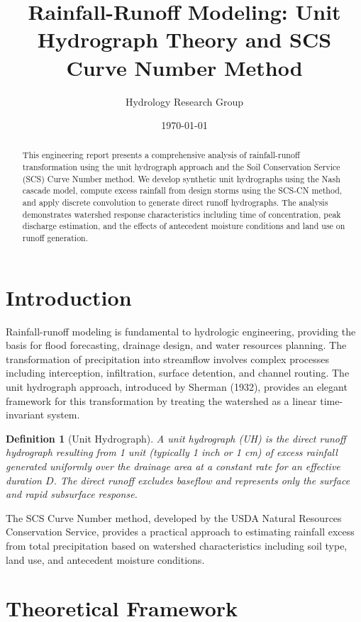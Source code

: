 \documentclass[a4paper, 11pt]{article}
\title{Rainfall-Runoff Modeling: Unit Hydrograph Theory and SCS Curve Number Method}
\author{Hydrology Research Group}
\date{\today}
\newtheorem{definition}{Definition}[section]
\begin{document}
\maketitle

\begin{abstract}
This engineering report presents a comprehensive analysis of rainfall-runoff transformation
using the unit hydrograph approach and the Soil Conservation Service (SCS) Curve Number method.
We develop synthetic unit hydrographs using the Nash cascade model, compute excess rainfall
from design storms using the SCS-CN method, and apply discrete convolution to generate direct
runoff hydrographs. The analysis demonstrates watershed response characteristics including
time of concentration, peak discharge estimation, and the effects of antecedent moisture
conditions and land use on runoff generation.
\end{abstract}

\section{Introduction}

Rainfall-runoff modeling is fundamental to hydrologic engineering, providing the basis
for flood forecasting, drainage design, and water resources planning. The transformation
of precipitation into streamflow involves complex processes including interception,
infiltration, surface detention, and channel routing. The unit hydrograph approach,
introduced by Sherman (1932), provides an elegant framework for this transformation
by treating the watershed as a linear time-invariant system.

\begin{definition}[Unit Hydrograph]
A unit hydrograph (UH) is the direct runoff hydrograph resulting from 1 unit (typically
1 inch or 1 cm) of excess rainfall generated uniformly over the drainage area at a constant
rate for an effective duration $D$. The direct runoff excludes baseflow and represents
only the surface and rapid subsurface response.
\end{definition}

The SCS Curve Number method, developed by the USDA Natural Resources Conservation Service,
provides a practical approach to estimating rainfall excess from total precipitation based
on watershed characteristics including soil type, land use, and antecedent moisture conditions.

\section{Theoretical Framework}
\end{document}
